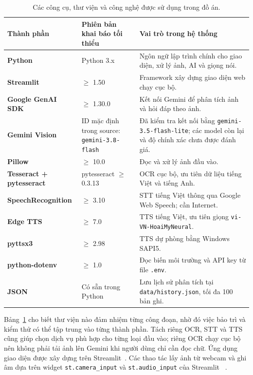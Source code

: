 \begin{table}[H]
\centering
\caption{Các công cụ, thư viện và công nghệ được sử dụng trong đồ án.}
\label{tab:congcu}
\begin{tabular*}{\textwidth}{@{\extracolsep{\fill}}>{\bfseries\color{daunavy}}p{3.1cm} >{\color{daumaroon}}p{3.1cm} p{7.0cm}}
\toprule
\rowcolor{gray100}
Thành phần & Phiên bản khai báo tối thiểu & Vai trò trong hệ thống \\
\midrule
Python & Python 3.x & Ngôn ngữ lập trình chính cho giao diện, xử lý ảnh, AI và giọng nói. \\
Streamlit & $\ge$ 1.50 & Framework xây dựng giao diện web chạy cục bộ. \\
Google GenAI SDK & $\ge$ 1.30.0 & Kết nối Gemini để phân tích ảnh và hỏi đáp theo ảnh. \\
Gemini Vision & ID mặc định trong source: \texttt{gemini-3.8-flash} & Đã kiểm tra kết nối bằng \texttt{gemini-3.5-flash-lite}; các model còn lại và độ chính xác chưa được đánh giá. \\
Pillow & $\ge$ 10.0 & Đọc và xử lý ảnh đầu vào. \\
Tesseract + pytesseract & pytesseract $\ge$ 0.3.13 & OCR cục bộ, ưu tiên dữ liệu tiếng Việt và tiếng Anh. \\
SpeechRecognition & $\ge$ 3.10 & STT tiếng Việt thông qua Google Web Speech; cần Internet. \\
Edge TTS & $\ge$ 7.0 & TTS tiếng Việt, ưu tiên giọng \texttt{vi-VN-HoaiMyNeural}. \\
pyttsx3 & $\ge$ 2.98 & TTS dự phòng bằng Windows SAPI5. \\
python-dotenv & $\ge$ 1.0 & Đọc biến môi trường và API key từ file \texttt{.env}. \\
JSON & Có sẵn trong Python & Lưu lịch sử phân tích tại \texttt{data/history.json}, tối đa 100 bản ghi. \\
\bottomrule
\end{tabular*}
\end{table}

Bảng~\ref{tab:congcu} cho biết thư viện nào đảm nhiệm từng công đoạn, nhờ đó
việc bảo trì và kiểm thử có thể tập trung vào từng thành phần. Tách riêng OCR,
STT và TTS cũng giúp chọn dịch vụ phù hợp cho từng loại đầu vào; riêng OCR
chạy cục bộ nên không phải tải ảnh lên Gemini khi người dùng chỉ cần đọc chữ.
Ứng dụng giao diện được xây dựng trên Streamlit~\cite{StreamlitDocumentation2026}.
Các thao tác lấy ảnh từ webcam và ghi âm dựa trên widget
\texttt{st.camera\_input} và \texttt{st.audio\_input} của Streamlit
~\cite{StreamlitCameraInput2026,StreamlitAudioInput2026}.

